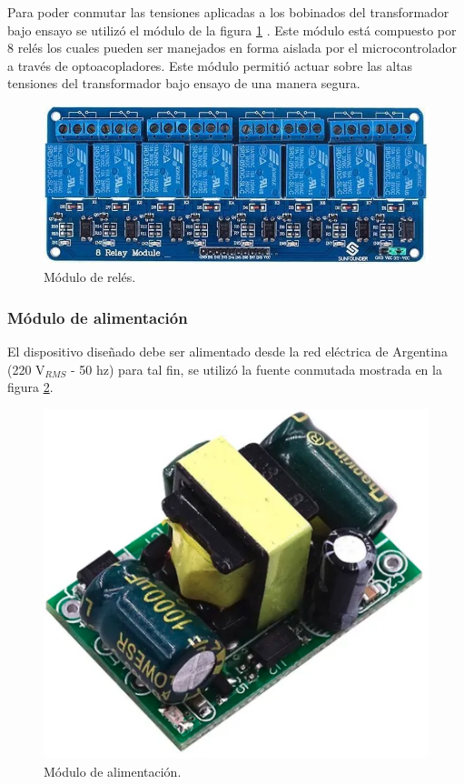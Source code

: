 Para poder conmutar las tensiones aplicadas a los bobinados del transformador bajo ensayo se utilizó el módulo de la figura \ref{fig:reles} . Este módulo está compuesto por 8 relés los cuales pueden ser manejados en forma aislada por el microcontrolador a través de optoacopladores. Este módulo permitió actuar sobre las altas tensiones del transformador bajo ensayo de una manera segura.

\begin{figure}[htpb]
	\centering
	\includegraphics[scale=0.7]{./Figures/reles.jpeg}
	\caption{Módulo de relés.}
	\label{fig:reles}
\end{figure}

\pagebreak

\subsubsection{Módulo de alimentación}
\label{subsubsec:ModAlim}

El dispositivo diseñado debe ser alimentado desde la red eléctrica de Argentina (220 V$_{RMS}$ - 50 hz) para tal fin, se utilizó la fuente conmutada mostrada en la figura \ref{fig:fte}.

\begin{figure}[htpb]
	\centering
	\includegraphics[scale=0.6]{./Figures/fte.png}
	\caption{Módulo de alimentación.}
	\label{fig:fte}
\end{figure}

